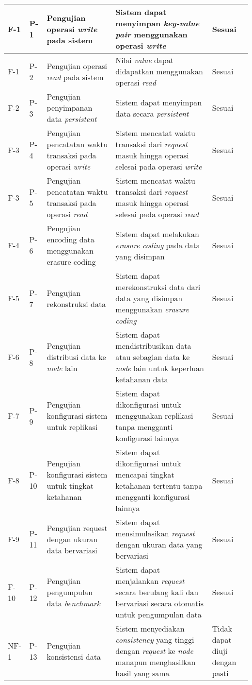 \begin{longtable}{|l|l|p{3cm}|p{3cm}|l|}
F-1 & P-1 & Pengujian operasi \textit{write} pada sistem & Sistem dapat menyimpan \textit{key-value pair} menggunakan operasi \textit{write} & Sesuai \\ \hline
F-1 & P-2 & Pengujian operasi \textit{read} pada sistem & Nilai \textit{value} dapat didapatkan menggunakan operasi \textit{read} & Sesuai \\ \hline
F-2 & P-3 & Pengujian penyimpanan data \textit{persistent} & Sistem dapat menyimpan data secara \textit{persistent} & Sesuai \\ \hline
F-3 & P-4 & Pengujian pencatatan waktu transaksi pada operasi \textit{write} & Sistem mencatat waktu transaksi dari \textit{request} masuk hingga operasi selesai pada operasi \textit{write} & Sesuai \\ \hline
F-3 & P-5 & Pengujian pencatatan waktu transaksi pada operasi \textit{read} & Sistem mencatat waktu transaksi dari \textit{request} masuk hingga operasi selesai pada operasi \textit{read} & Sesuai \\ \hline
F-4 & P-6 & Pengujian encoding data menggunakan erasure coding & Sistem dapat melakukan \textit{erasure coding} pada data yang disimpan & Sesuai \\ \hline
F-5 & P-7 & Pengujian rekonstruksi data & Sistem dapat merekonstruksi data dari data yang disimpan menggunakan \textit{erasure coding} & Sesuai \\ \hline
F-6 & P-8 & Pengujian distribusi data ke \textit{node} lain & Sistem dapat mendistribusikan data atau sebagian data ke \textit{node} lain untuk keperluan ketahanan data & Sesuai \\ \hline
F-7 & P-9 & Pengujian konfigurasi sistem untuk replikasi & Sistem dapat dikonfigurasi untuk menggunakan replikasi tanpa mengganti konfigurasi lainnya & Sesuai \\ \hline
F-8 & P-10 & Pengujian konfigurasi sistem untuk tingkat ketahanan & Sistem dapat dikonfigurasi untuk mencapai tingkat ketahanan tertentu tanpa mengganti konfigurasi lainnya & Sesuai \\ \hline
F-9 & P-11 & Pengujian request dengan ukuran data bervariasi & Sistem dapat mensimulasikan \textit{request} dengan ukuran data yang bervariasi & Sesuai \\ \hline
F-10 & P-12 & Pengujian pengumpulan data \textit{benchmark} & Sistem dapat menjalankan \textit{request} secara berulang kali dan bervariasi secara otomatis untuk pengumpulan data & Sesuai \\ \hline
NF-1 & P-13 & Pengujian konsistensi data & Sistem menyediakan \textit{consistency} yang tinggi dengan \textit{request} ke \textit{node} manapun menghasilkan hasil yang sama & Tidak dapat diuji dengan pasti \\ \hline

\end{longtable}
